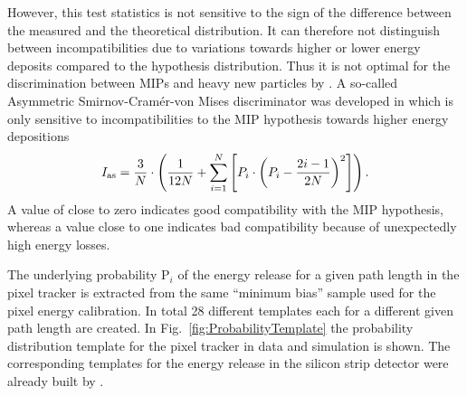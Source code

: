 However, this test statistics is not sensitive to the sign of the difference between the measured and the theoretical distribution.
It can therefore not distinguish between incompatibilities due to variations towards higher or lower energy deposits compared to the hypothesis distribution.
Thus it is not optimal for the discrimination between MIPs and heavy new particles by \dedx.
A so-called Asymmetric Smirnov-Cram\'{e}r-von Mises discriminator was developed in \cite{bib:Quertenmont_2010} which is only sensitive to incompatibilities to the MIP hypothesis towards higher energy depositions
\begin{equation}
I_{\text{as}} = \frac{3}{N} \cdot \left( \frac{1}{12N} + \sum\limits_{i=1}^N \left[ P_i \cdot \left(P_i - \frac{2i-1}{2N} \right)^2 \right] \right).
\end{equation}
A value of \ias close to zero indicates good compatibility with the MIP hypothesis, whereas a value close to one indicates bad compatibility because of unexpectedly high energy losses.

The underlying probability P$_i$ of the energy release for a given path length in the pixel tracker is extracted from the same ``minimum bias'' sample used for the pixel energy calibration.
In total 28 different templates each for a different given path length are created.
In Fig.~\ref{fig:ProbabilityTemplate} the probability distribution template for the pixel tracker in data and simulation is shown.
The corresponding templates for the energy release in the silicon strip detector were already built by  \cite{bib:Quertenmont_2010}.


